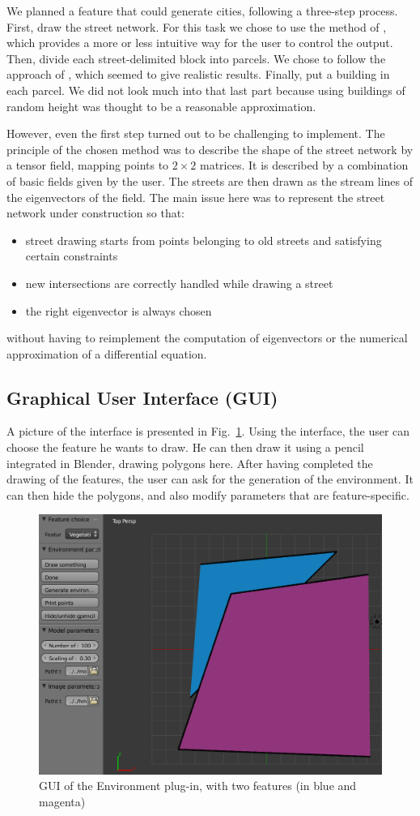 We planned a feature that could generate cities, following a three-step
process. First, draw the street network. For this task we chose to use the
method of \cite{StreetTensors}, which provides a more or less intuitive way for
the user to control the output. Then, divide each street-delimited block into
parcels. We chose to follow the approach of \cite{PGParcels}, which seemed to
give realistic results. Finally, put a building in each parcel. We did not look
much into that last part because using buildings of random height was thought
to be a reasonable approximation.

However, even the first step turned out to be challenging to implement. The
principle of the chosen method was to describe the shape of the street network
by a tensor field, mapping points to $2 \times 2$ matrices. It is described by
a combination of basic fields given by the user. The streets are then drawn as
the stream lines of the eigenvectors of the field. The main issue here was to
represent the street network under construction so that:
\begin{itemize}
  \item street drawing starts from points belonging to old streets and
    satisfying certain constraints
  \item new intersections are correctly handled while drawing a street
  \item the right eigenvector is always chosen
\end{itemize}
without having to reimplement the computation of eigenvectors or the numerical
approximation of a differential equation.


\subsection{Graphical User Interface (GUI)}

A picture of the interface is presented in Fig.~\ref{fig:env-gui1}. Using the interface, the user can choose the feature he wants to draw. He can then draw it using a pencil integrated in Blender, drawing polygons here. After having completed the drawing of the features, the user can ask for the generation of the environment. It can then hide the polygons, and also modify parameters that are feature-specific.

\begin{figure}
\includegraphics[width=\textwidth]{img/env_gui1.png}
\caption{GUI of the Environment plug-in, with two features (in blue and magenta)}
\label{fig:env-gui1}
\end{figure}

